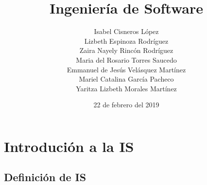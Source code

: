 \documentclass{book}
\title{Ingenier\'ia de Software}
\author{ Isabel Cisneros L\'opez \\ Lizbeth Espinoza Rodr\'iguez \\ Zaira Nayely Rinc\'on Rodr\'iguez \\ Maria del Rosario Torres Saucedo\\ Emmanuel de Jes\'us Vel\'asquez Mart\'inez \\ Mariel Catalina Garc\'ia Pacheco \\ Yaritza Lizbeth Morales Mart\'inez }
\date{22 de febrero del 2019}
\begin{document}
\maketitle

\chapter{Introduci\'on a la IS}

\section{ Definici\'on de IS}



%  

%
\end{document}
